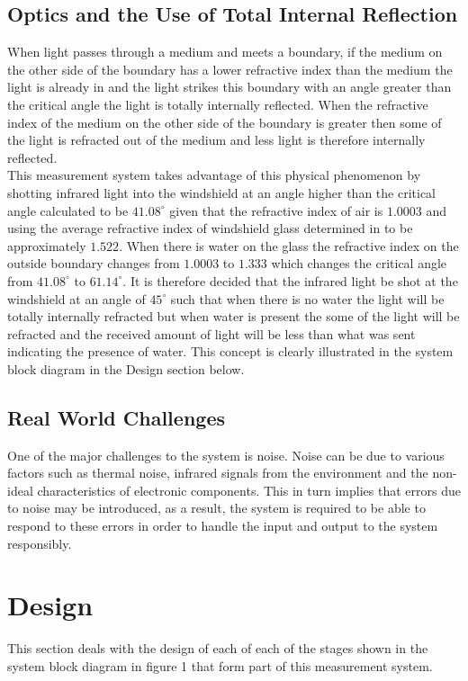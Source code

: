 \documentclass[conference, 11pt]{IEEEtran}
\begin{document}
	
\subsection{Optics and the Use of Total Internal Reflection}
When light passes through a medium and meets a boundary, if the medium on the other side of the boundary has a lower refractive index than the medium the light is already in and the light strikes this boundary with an angle greater than the critical angle the light is totally internally reflected. When the refractive index of the medium on the other side of the boundary is greater then some of the light is refracted out of the medium and less light is therefore internally reflected. \\

This measurement system takes advantage of this physical phenomenon by shotting infrared light into the windshield at an angle higher than the critical angle calculated to be $41.08 ^{\circ}$ given that the refractive index of air is $1.0003$ and using the average refractive index of windshield glass determined in \cite{RI} to be approximately $1.522$. When there is water on the glass the refractive index on the outside boundary changes from $1.0003$ to $1.333$ which changes the critical angle from $41.08 ^{\circ}$ to $61.14 ^{\circ}$. It is therefore decided that the infrared light be shot at the windshield at an angle of $45 ^{\circ}$ such that when there is no water the light will be totally internally refracted but when water is present the some of the light will be refracted and the received amount of light will be less than what was sent indicating the presence of water. This concept is clearly illustrated in the system block diagram in the Design section below. 

	
\subsection{Real World Challenges}
One of the major challenges to the system is noise. Noise can be due to various factors such as thermal noise, infrared signals from the environment and the non-ideal characteristics of electronic components. This in turn implies that errors due to noise may be introduced, as a result, the system is required to be able to respond to these errors in order to handle the input and output to the system responsibly.
\cite{NOISE}
	
\section{Design}
This section deals with the design of each of each of the stages shown in the system block diagram in figure 1 that form part of this measurement system. 
\end{document}
